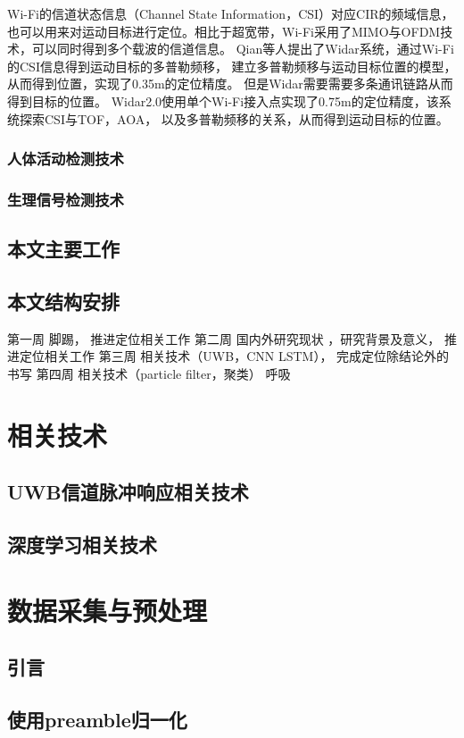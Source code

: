 Wi-Fi的信道状态信息（Channel State Information，CSI）对应CIR的频域信息，
也可以用来对运动目标进行定位。相比于超宽带，Wi-Fi采用了MIMO与OFDM技术，可以同时得到多个载波的信道信息。
Qian等人\cite{Qian}提出了Widar系统，通过Wi-Fi的CSI信息得到运动目标的多普勒频移，
建立多普勒频移与运动目标位置的模型，从而得到位置，实现了0.35m的定位精度。
但是Widar需要需要多条通讯链路从而得到目标的位置。
Widar2.0使用单个Wi-Fi接入点实现了0.75m的定位精度，该系统探索CSI与TOF，AOA，
以及多普勒频移的关系，从而得到运动目标的位置。

\subsection{人体活动检测技术}


\subsection{生理信号检测技术}

\section{本文主要工作}
\section{本文结构安排}

第一周       脚踢， 推进定位相关工作
第二周       国内外研究现状 ，研究背景及意义， 推进定位相关工作
第三周       相关技术（UWB，CNN LSTM）， 完成定位除结论外的书写
第四周       相关技术（particle filter，聚类） 呼吸
\chapter{相关技术}
\section{UWB信道脉冲响应相关技术}
\section{深度学习相关技术}

\chapter{数据采集与预处理}
\section{引言}
\section{使用preamble归一化}
